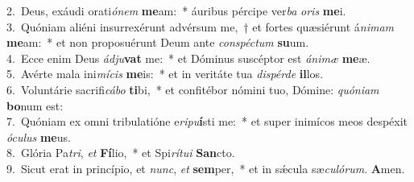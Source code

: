 {2.~}Deus, exáudi orati\textit{ó}\textit{nem} \textbf{me}am:~* áuribus pércipe ver\textit{ba} \textit{o}\textit{ris} \textbf{me}i.\\
{3.~}Quóniam aliéni insurrexérunt advérsum me,~† et fortes quæsiérunt á\textit{ni}\textit{mam} \textbf{me}am:~* et non proposuérunt Deum ante \textit{con}\textit{spé}\textit{ctum} \textbf{su}um.\\
{4.~}Ecce enim Deus \textit{ád}\textit{ju}\textbf{vat} me:~* et Dóminus suscéptor est \textit{á}\textit{ni}\textit{mæ} \textbf{me}æ.\\
{5.~}Avérte mala ini\textit{mí}\textit{cis} \textbf{me}is:~* et in veritáte tua \textit{di}\textit{spér}\textit{de} \textbf{il}los.\\
{6.~}Voluntárie sacrifi\textit{cá}\textit{bo} \textbf{ti}bi,~* et confitébor nómini tuo, Dómine: \textit{quó}\textit{ni}\textit{am} \textbf{bo}num est:\\
{7.~}Quóniam ex omni tribulatióne e\textit{ri}\textit{pu}\textbf{í}sti me:~* et super inimícos meos despéxit \textit{ó}\textit{cu}\textit{lus} \textbf{me}us.\\
{8.~}Glória Pa\textit{tri}, \textit{et} \textbf{Fí}lio,~* et Spi\textit{rí}\textit{tu}\textit{i} \textbf{San}cto.\\
{9.~}Sicut erat in princípio, et \textit{nunc}, \textit{et} \textbf{sem}per,~* et in sǽcula sæ\textit{cu}\textit{ló}\textit{rum}. \textbf{A}men.\\
